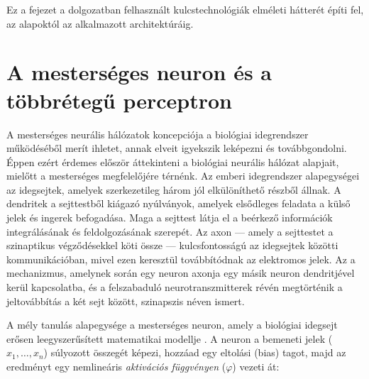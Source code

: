 
Ez a fejezet a dolgozatban felhasznált kulcstechnológiák elméleti hátterét
építi fel, az alapoktól az alkalmazott architektúráig.

\section{A mesterséges neuron és a többrétegű perceptron}

A mesterséges neurális hálózatok koncepciója a biológiai idegrendszer működéséből
merít ihletet, annak elveit igyekszik leképezni és továbbgondolni.
Éppen ezért érdemes először áttekinteni a biológiai neurális hálózat alapjait,
mielőtt a mesterséges megfelelőjére térnénk.
Az emberi idegrendszer alapegységei az idegsejtek, amelyek szerkezetileg három
jól elkülöníthető részből állnak. A dendritek a sejttestből kiágazó nyúlványok,
amelyek elsődleges feladata a külső jelek és ingerek befogadása. 
Maga a sejttest látja el a beérkező információk integrálásának és feldolgozásának
szerepét. Az axon — amely a sejttestet a szinaptikus végződésekkel köti össze — 
kulcsfontosságú az idegsejtek közötti kommunikációban, mivel ezen keresztül
továbbítódnak az elektromos jelek. Az a mechanizmus, amelynek során egy neuron
axonja egy másik neuron dendritjével kerül kapcsolatba, és a felszabaduló
neurotranszmitterek révén megtörténik a jeltovábbítás a két sejt között, szinapszis néven ismert.

A mély tanulás alapegysége a mesterséges neuron, amely a biológiai idegsejt
erősen leegyszerűsített matematikai modellje \cite{goodfellow2016deep}. A neuron
a bemeneti jelek ($x_1, \dots, x_n$) súlyozott összegét képezi, hozzáad egy
eltolási (bias) tagot, majd az eredményt egy nemlineáris \textit{aktivációs
függvényen} ($\varphi$) vezeti át:

